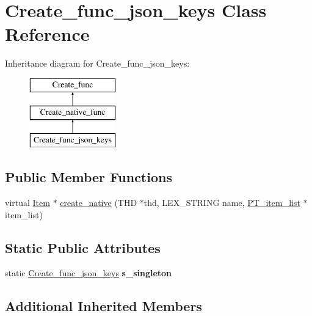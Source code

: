 \hypertarget{classCreate__func__json__keys}{}\section{Create\+\_\+func\+\_\+json\+\_\+keys Class Reference}
\label{classCreate__func__json__keys}
Inheritance diagram for Create\+\_\+func\+\_\+json\+\_\+keys\+:\begin{figure}[H]
\begin{center}
\leavevmode
\includegraphics[height=3.000000cm]{classCreate__func__json__keys}
\end{center}
\end{figure}
\subsection*{Public Member Functions}
\begin{DoxyCompactItemize}
\item 
virtual \mbox{\hyperlink{classItem}{Item}} $\ast$ \mbox{\hyperlink{classCreate__func__json__keys_a626d6471078a8b9393a6bc98e8e8906e}{create\+\_\+native}} (T\+HD $\ast$thd, L\+E\+X\+\_\+\+S\+T\+R\+I\+NG name, \mbox{\hyperlink{classPT__item__list}{P\+T\+\_\+item\+\_\+list}} $\ast$item\+\_\+list)
\end{DoxyCompactItemize}
\subsection*{Static Public Attributes}
\begin{DoxyCompactItemize}
\item 
\mbox{\label{classCreate__func__json__keys_a7852f78c936c426df158f1f3285ff021}} 
static \mbox{\hyperlink{classCreate__func__json__keys}{Create\+\_\+func\+\_\+json\+\_\+keys}} {\bfseries s\+\_\+singleton}
\end{DoxyCompactItemize}
\subsection*{Additional Inherited Members}


